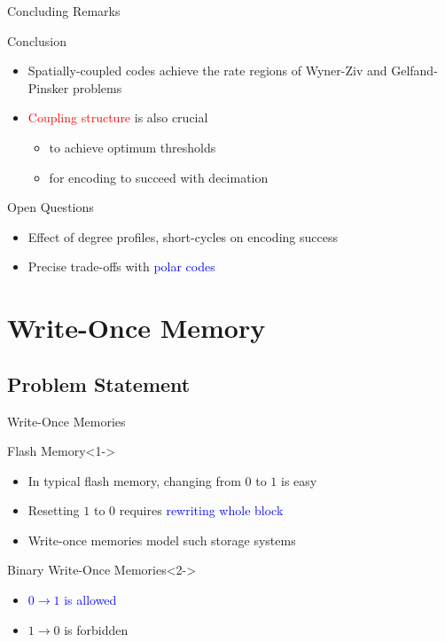 \documentclass[10pt]{beamer}
\def\WOM_path{../compound-codes/WOM/slides/Figures}
\begin{document}
\begin{frame}{Concluding Remarks}
  \begin{block}{Conclusion}
    \begin{itemize}
    \item Spatially-coupled codes achieve the rate regions of Wyner-Ziv and Gelfand-Pinsker problems \vspace{0.2cm}
    \item \textcolor{red}{Coupling structure} is also crucial 
      \begin{itemize}
      \item to achieve optimum thresholds
      \item for encoding to succeed with decimation 
      \end{itemize}
    \end{itemize}
  \end{block}
  \begin{block}{Open Questions}
    \begin{itemize}
    \item Effect of degree profiles, short-cycles on encoding success \vspace{0.2cm}
    \item Precise trade-offs with \textcolor{blue}{polar codes}
    \end{itemize}
  \end{block}
\end{frame}

\section{Write-Once Memory}
\subsection{Problem Statement}
\begin{frame}{Write-Once Memories}
  \begin{center}
    \scalebox{0.5}{}    
  \end{center}
  \begin{block}{Flash Memory}<1->
    \begin{itemize}
    \item In typical flash memory, changing from $0$ to $1$ is easy
    \item Resetting $1$ to $0$ requires \textcolor{blue}{rewriting whole block}
    \item Write-once memories model such storage systems
    \end{itemize}
  \end{block}
  \begin{block}{Binary Write-Once Memories}<2->
    \begin{itemize}
    \item<2-> \textcolor{blue}{$0 \longrightarrow 1$ is allowed}
    \item<3-> \alert{$1 \longrightarrow 0$ is forbidden}
    \end{itemize}
  \end{block}
\end{frame}
\end{document}
